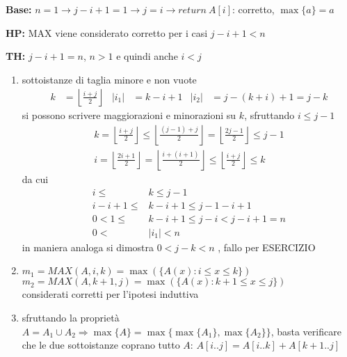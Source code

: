 \begin{description}
    \item{\textbf{Base:}} $n=1 \rightarrow j-i+1=1 \rightarrow j=i \rightarrow return \: A[i]$: corretto, $\max\{a\}=a$
    \item{\textbf{HP:}} MAX viene considerato corretto per i casi $j-i+1 < n$
    \item{\textbf{TH:}} $j-i+1 = n$, $n>1$ e quindi anche $i<j$
        \begin{enumerate}[noitemsep,topsep=0pt,parsep=0pt,partopsep=0pt]
            \item sottoistanze di taglia minore e non vuote
                \begin{align*}
                    k&= \left\lfloor \frac{i+j}{2}\right\rfloor & |i_1| &= k-i+1  & |i_2| &= j-(k+i)+1 = j-k
                \end{align*}
                si possono scrivere maggiorazioni e minorazioni su $k$, sfruttando $i \leq j-1$
                \begin{gather*}
                    k= \left\lfloor \frac{i+j}{2}\right\rfloor \leq
                    \left\lfloor \frac{(j-1)+j}{2}\right\rfloor = 
                    \left\lfloor \frac{2j-1}{2}\right\rfloor \leq j-1 \\
                    i= \left\lfloor \frac{2i+1}{2}\right\rfloor
                    = \left\lfloor \frac{i+(i+1)}{2}\right\rfloor 
                    \leq \left\lfloor \frac{i+j}{2}\right\rfloor 
                    \leq k
                \end{gather*}
                da cui 
                \begin{equation*}
                    \begin{split}
                    i \leq &k \leq j-1 \\
                    i-i+1 \leq &k-i+1 \leq j-1-i+1 \\
                    0 < 1 \leq &k-i+1 \leq j-i < j-i+1 = n\\
                    0 < &|i_1| < n
                    \end{split}
                \end{equation*}
                in maniera analoga si dimostra $ 0 < j-k < n $ , fallo per ESERCIZIO
            \item 
                $m_1 = MAX(A,i,k) = \max(\{A(x):i \leq x \leq k \}) $ \\
                $m_2 = MAX(A,k+1,j) = \max(\{A(x):k+1 \leq x \leq j \}) $ \\
                considerati corretti per l'ipotesi induttiva
            \item sfruttando la proprietà $ A = A_1 \cup A_2 \Rightarrow \max\{A\} = \max\{\max\{A_1\}, \max\{A_2\}\}$,
                basta verificare che le due sottoistanze coprano tutto $A$: $A[i..j] = A[i..k] + A[k+1..j] $ 
        \end{enumerate}
\end{description}

